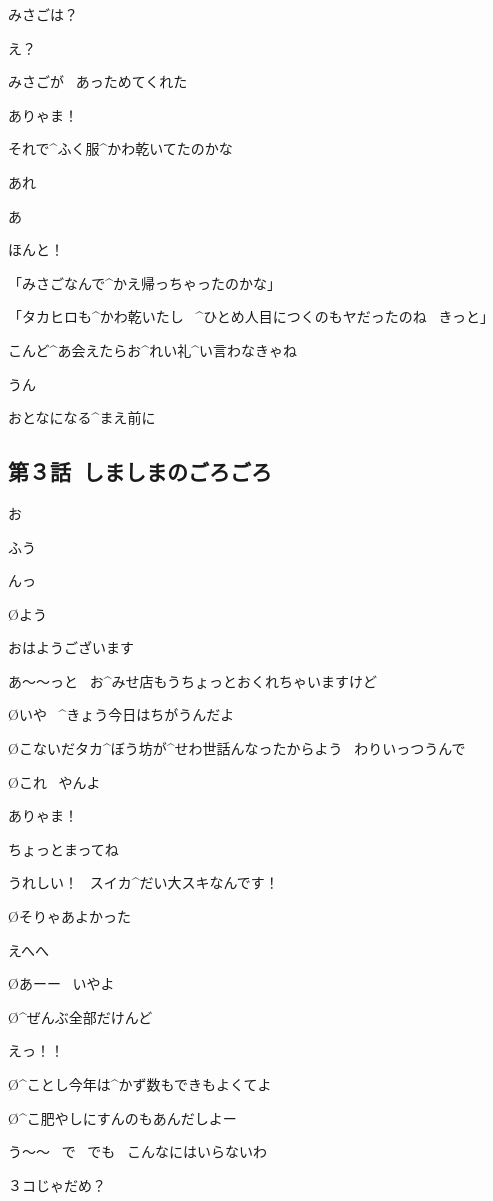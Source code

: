 \T みさごは？

\A え？

\page
\T みさごが
\ あっためてくれた

\A ありゃま！

\A それで^{ふく}{服}^{かわ}{乾}いてたのかな

\T あれ

\A あ

\A ほんと！

\page
\T 「みさごなんで^{かえ}{帰}っちゃったのかな」

\A 「タカヒロも^{かわ}{乾}いたし
\ ^{ひとめ}{人目}につくのもヤだったのね
\ きっと」

\A こんど^{あ}{会}えたらお^{れい}{礼}^{い}{言}わなきゃね

\T うん

\T おとなになる^{まえ}{前}に


\subsection{第３話\ しましまのごろごろ}

\page[65]
\A お

\A ふう

\page[67]
\A んっ

\O よう

\A おはようございます

\page
\A あ〜〜っと
\ お^{みせ}{店}もうちょっとおくれちゃいますけど

\O いや
\ ^{きょう}{今日}はちがうんだよ

\O こないだタカ^{ぼう}{坊}が^{せわ}{世話}んなったからよう
\ わりいっつうんで

\O これ
\ やんよ

\A ありゃま！

\A ちょっとまってね

\A うれしい！
\ スイカ^{だい}{大}スキなんです！

\O そりゃあよかった

\page
\A えへへ

\O あーー
\ いやよ

\O ^{ぜんぶ}{全部}だけんど

\A えっ！！

\O ^{ことし}{今年}は^{かず}{数}もできもよくてよ

\O ^{こ}{肥}やしにすんのもあんだしよー

\A う〜〜
\ で
\ でも
\ こんなにはいらないわ

\A ３コじゃだめ？

